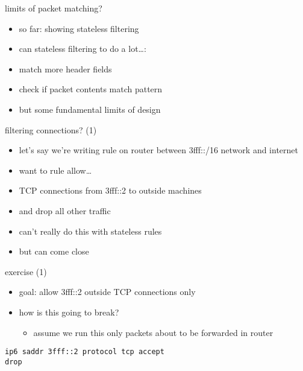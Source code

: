 \begin{frame}{limits of packet matching?}
    \begin{itemize}
    \item so far: showing stateless filtering
    \vspace{.5cm}
    \item can stateless filtering to do a lot\ldots:
    \item match more header fields
    \item check if packet contents match pattern
    \vspace{.5cm}
    \item but some fundamental limits of design
    \end{itemize}
\end{frame}

\begin{frame}[fragile]{filtering connections? (1)}
    \begin{itemize}
    \item let's say we're writing rule on router between 3fff::/16 network
    and internet
    \item want to rule allow\ldots
    \item TCP connections from 3fff::2 to outside machines
    \item and drop all other traffic
    \vspace{.5cm}
    \item can't really do this with stateless rules
    \item but can come close
    \end{itemize}
\end{frame}

\begin{frame}[fragile]{exercise (1)}
\begin{itemize}
\item goal: allow 3fff::2 outside TCP connections only
\item how is this going to break?
    \begin{itemize}
    \item assume we run this only packets about to be forwarded in router
    \end{itemize}
\end{itemize}
\begin{Verbatim}[fontsize=\fontsize{9}{10}]
ip6 saddr 3fff::2 protocol tcp accept
drop
\end{Verbatim}
\end{frame}

